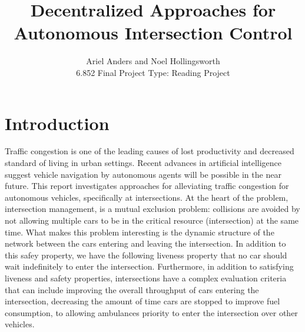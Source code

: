 \documentclass[12pt]{article}
\title{Decentralized Approaches for Autonomous Intersection Control }
\author{Ariel Anders and Noel Hollingsworth\\ 6.852 Final Project Type: Reading Project}
\begin{document}
\maketitle 

\pagebreak
\tableofcontents
\pagebreak

\section{Introduction}

Traffic congestion is one of the leading causes of lost productivity and decreased standard of living in urban settings. Recent advances in artificial intelligence suggest vehicle navigation by autonomous agents will be possible in the near future.\cite{dresner}  
This report investigates approaches for alleviating traffic congestion for autonomous vehicles, specifically at intersections. At the heart of the problem, intersection management, is a mutual exclusion problem: collisions are avoided by not allowing multiple cars to be in the critical resource (intersection) at the same time.  What makes this problem interesting is the dynamic structure of the network between the cars entering and leaving the intersection.  In addition to this safey property, we have the following liveness property that no car should wait indefinitely to enter the intersection.  Furthermore, in addition to satisfying liveness and safety properties, intersections have a complex evaluation criteria that can include improving the overall throughput of cars entering the intersection, decreasing the amount of time cars are stopped to improve fuel consumption, to allowing ambulances  priority to enter the intersection over other vehicles.
\end{document}
